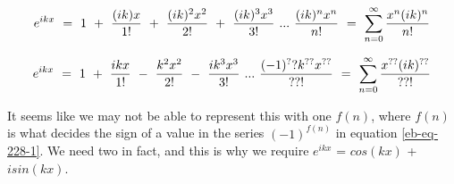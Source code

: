 \documentclass{article}
\begin{document}
\begin{equation} \label{eb-eq-227-1}
e^{ikx} \hspace{0.125cm} = \hspace{0.125cm} 1 \hspace{0.125cm} + \hspace{0.125cm} \frac{(ik)x}{1!} \hspace{0.125cm} + \hspace{0.125cm} \frac{(ik)^2x^2}{2!} \hspace{0.125cm} + \hspace{0.125cm} \frac{(ik)^3x^3}{3!} \hspace{0.125cm} ... \hspace{0.125cm} \frac{(ik)^{n}x^{n}}{n!} \hspace{0.125cm} = \hspace{0.125cm} \sum_{n=0}^{\infty} \frac{x^{n}(ik)^{n}}{n!}
\end{equation}

\begin{equation} \label{eb-eq-228-1}
e^{ikx} \hspace{0.125cm} = \hspace{0.125cm} 1 \hspace{0.125cm} + \hspace{0.125cm} \frac{ikx}{1!} \hspace{0.125cm} - \hspace{0.125cm} \frac{k^2x^2}{2!} \hspace{0.125cm} -  \hspace{0.125cm} \frac{i k^3x^3}{3!} \hspace{0.125cm} ... \hspace{0.125cm} \frac{(-1)^?? k^{??}x^{??}}{??!} \hspace{0.125cm} = \hspace{0.125cm} \sum_{n=0}^{\infty} \frac{x^{??}(ik)^{??}}{??!}
\end{equation}

It seems like we may not be able to represent this with one \begin{math} f(n) \end{math}, where \begin{math} f(n) \end{math} is what decides the sign of a value in the series \begin{math} (-1)^{f(n)} \end{math} in equation \ref{eb-eq-228-1}. We need two in fact, and this is why we require \begin{math} e^{ikx} \end{math} =  \begin{math} cos(kx) \end{math} +  \begin{math} i sin(kx) \end{math}.
\end{document}
